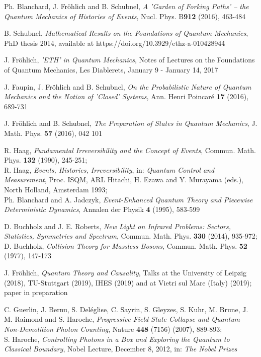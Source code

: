 \documentclass[a4paper,11pt]{article}
\begin{document}
\begin{thebibliography}{References}
 Ph. Blanchard, J. Fr\"{o}hlich and B. Schubnel, \textit{A 'Garden of Forking Paths' -- the Quantum Mechanics of Histories of Events}, Nucl. Phys. B{{\bf912}} (2016), 463-484

 B. Schubnel, \textit{Mathematical Results on the Foundations of Quantum Mechanics}, PhD thesis 2014, available at https://doi.org/10.3929/ethz-a-010428944

 J. Fr\"{o}hlich, \textit{ 'ETH' in Quantum Mechanics}, Notes of Lectures on the Foundations of Quantum Mechanics, Les Diablerets, January 9 - January 14, 2017

 J. Faupin, J. Fr\"{o}hlich and B. Schubnel, \textit{On the Probabilistic Nature of Quantum Mechanics and the Notion of 'Closed' Systems}, Ann. Henri Poincar\'e {\bf{17}} (2016), 689-731

 J. Fr\"{o}hlich and B. Schubnel, \textit{The Preparation of States in Quantum Mechanics}, J. Math. Phys. {\bf{57}} (2016), 042 101

 R. Haag, \textit{Fundamental Irreversibility and the Concept of Events}, Commun. Math. Phys. {\bf{132}} (1990), 245-251;\\
R. Haag, \textit{Events, Histories, Irreversibility}, in: \textit{Quantum Control and Measurement}, Proc. ISQM, ARL Hitachi, H. Ezawa and Y. Murayama (eds.), North Holland, Amsterdam 1993;\\
Ph. Blanchard and A. Jadczyk, \textit{Event-Enhanced Quantum Theory and Piecewise Deterministic Dynamics}, Annalen der Physik {\bf{4}} (1995), 583-599

 D. Buchholz and J. E. Roberts, \textit{New Light on Infrared Problems: Sectors, Statistics, Symmetries and Spectrum}, Commun. Math. Phys. {\bf{330}} (2014), 935-972;\\
D. Buchholz, \textit{Collision Theory for Massless Bosons}, Commun. Math. Phys. {\bf{52}} (1977), 147-173

 J. Fr\"{o}hlich, \textit{Quantum Theory and Causality}, Talks at the University of Leipzig (2018), TU-Stuttgart (2019), IHES (2019) and at Vietri sul Mare (Italy) (2019); paper in preparation

 C. Guerlin, J. Bernu, S. Del\'eglise, C. Sayrin, S. Gleyzes, S. Kuhr, M. Brune, J. M. Raimond and S. Haroche, \textit{Progressive Field-State Collapse and Quantum Non-Demolition Photon Counting}, Nature {\bf{448}} (7156) (2007), 889-893;\\
S. Haroche, \textit{Controlling Photons in a Box and Exploring the Quantum to Classical Boundary}, Nobel Lecture, December 8, 2012, in: \textit{The Nobel Prizes}


\end{thebibliography}
\end{document}
